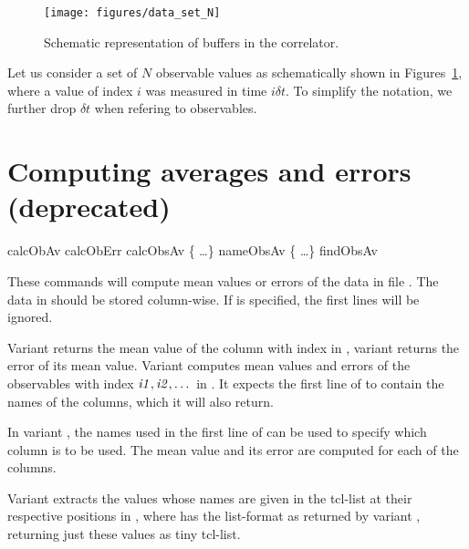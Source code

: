 \begin{figure}[ht]
\texttt{[image: figures/data\_set\_N]}
\caption{Schematic representation of buffers in the correlator.}
\label{fig:dataSet}
\end{figure}

Let us consider a set of $N$ observable values as schematically shown
in Figures~\ref{fig:dataSet}, where a value of index $i$ was measured
in time $i\delta t$. To simplify the notation, we further drop $\delta t$
when refering to observables.



\section{Computing averages and errors (deprecated)}


\begin{essyntax}
   calcObAv   
   calcObErr   
   calcObsAv  \{   \dots \} 
   nameObsAv  \{   \dots \} 
   findObsAv  
\end{essyntax}

These commands will compute mean values or errors of the data in file
. The data in  should be stored column-wise. If
 is specified, the first  lines will be ignored.

Variant  returns the mean value of the column with index
 in , variant  returns the error of
its mean value. Variant  computes mean values and errors of
the observables with index $\var{i1}, \var{i2}, \dots$ in
. It expects the first line of  to contain the
names of the columns, which it will also return.

In variant , the names used in the first line of 
can be used to specify which column is to be used.  The mean value and
its error are computed for each of the columns.

  Variant  extracts the values whose names are
given in the tcl-list  at their respective positions in
, where  has the list-format as returned by
variant , returning just these values as tiny tcl-list.

